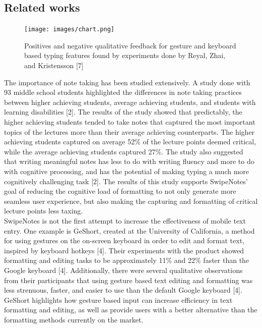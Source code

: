 \documentclass[conference]{IEEEtran}
\begin{document}
\subsection*{Related works}
\begin{figure}[ht]
    \centering
    \texttt{[image: images/chart.png]}\\
    \caption{Positives and negative qualitative feedback for gesture and keyboard based typing features found by experiments done by Reyal, Zhai, and Kristensson [7]}
    \label{fig:enter-label}
\end{figure}

The importance of note taking has been studied extensively. A study done with 93 middle school students highlighted the differences in note taking practices between higher achieving students, average achieving students, and students with learning disabilities [2]. The results of the study showed that predictably, the higher achieving students tended to take notes that captured the most important topics of the lectures more than their average achieving counterparts. The higher achieving students captured on average 52\% of the lecture points deemed critical, while the average achieving students captured 27\%. The study also suggested that writing meaningful notes has less to do with writing fluency and more to do with cognitive processing, and has the potential of making typing a much more cognitively challenging task [2]. The results of this study supports SwipeNotes’ goal of reducing the cognitive load of formatting to not only generate more seamless user experience, but also making the capturing and formatting of critical lecture points less taxing.
\\

SwipeNotes is not the first attempt to increase the effectiveness of mobile text entry. One example is GeShort, created at the University of California, a method for using gestures on the on-screen keyboard in order to edit and format text, inspired by keyboard hotkeys [4]. Their experiments with the product showed formatting and editing tasks to be approximately 11\% and 22\% faster than the Google keyboard [4]. Additionally, there were several qualitative observations from their participants that using gesture based text editing and formatting was less strenuous, faster, and easier to use than the default Google keyboard [4]. GeShort highlights how gesture based input can increase efficiency in text formatting and editing, as well as provide users with a better alternative than the formatting methods currently on the market.\\
\end{document}
